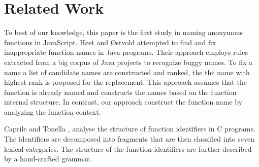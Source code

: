 \documentclass[10pt, preprint]{sigplanconf}
\begin{document}



\section{Related Work}

To best of our knowledge, this paper is the first study in naming anonymous functions in JavaScript. H{\o}st and {\O}stvold \cite{Host} attempted to find and fix inappropriate function names in Java programs. Their approach employs rules extracted from a big corpus of Java projects to recognize buggy names. To fix a name a list of candidate names are constructed and ranked, the the name with highest rank is proposed for the replacement. This approach assumes that the function is already named and constructs the names based on the function internal structure. In contrast, our approach construct the function name by analyzing the function context. 

Caprile and Tonella \cite{Caprile}, analyse the structure of function identifiers in C programs. The identifiers are decomposed into fragments that are then classified into seven lexical categories. The structure of the function identifiers are further described by a hand-crafted grammar.
\end{document}
